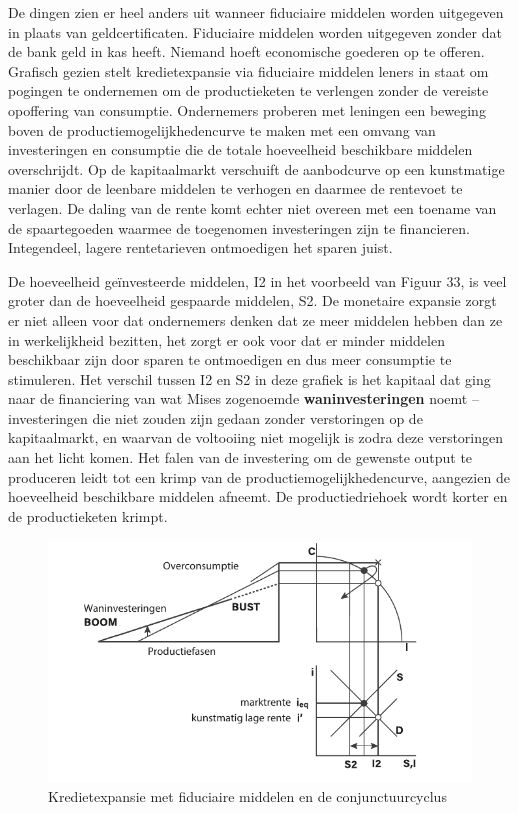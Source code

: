 De dingen zien er heel anders uit wanneer fiduciaire middelen worden uitgegeven in plaats van geldcertificaten. Fiduciaire middelen worden uitgegeven zonder dat de bank geld in kas heeft. Niemand hoeft economische goederen op te offeren. Grafisch gezien stelt kredietexpansie via fiduciaire middelen leners in staat om pogingen te ondernemen om de productieketen te verlengen zonder de vereiste opoffering van consumptie. Ondernemers proberen met leningen een beweging boven de productiemogelijkhedencurve te maken met een omvang van investeringen en consumptie die de totale hoeveelheid beschikbare middelen overschrijdt. Op de kapitaalmarkt verschuift de aanbodcurve op een kunstmatige manier door de leenbare middelen te verhogen en daarmee de rentevoet te verlagen. De daling van de rente komt echter niet overeen met een toename van de spaartegoeden waarmee de toegenomen investeringen zijn te financieren. Integendeel, lagere rentetarieven ontmoedigen het sparen juist.

De hoeveelheid geïnvesteerde middelen, I2 in het voorbeeld van Figuur 33, is veel groter dan de hoeveelheid gespaarde middelen, S2. De monetaire expansie zorgt er niet alleen voor dat ondernemers denken dat ze meer middelen hebben dan ze in werkelijkheid bezitten, het zorgt er ook voor dat er minder middelen beschikbaar zijn door sparen te ontmoedigen en dus meer consumptie te stimuleren. Het verschil tussen I2 en S2 in deze grafiek is het kapitaal dat ging naar de financiering van wat Mises zogenoemde \textbf{waninvesteringen} noemt -- investeringen die niet zouden zijn gedaan zonder verstoringen op de kapitaalmarkt, en waarvan de voltooiing niet mogelijk is zodra deze verstoringen aan het licht komen.\autocite{177} Het falen van de investering om de gewenste output te produceren leidt tot een krimp van de productiemogelijkhedencurve, aangezien de hoeveelheid beschikbare middelen afneemt. De productiedriehoek wordt korter en de productieketen krimpt.

\begin{figure}
\centering
    \includegraphics[width=\textwidth]{figures/fig33.pdf}
    \caption[Kredietexpansie met fiduciaire middelen en de conjunctuurcyclus]{Kredietexpansie met fiduciaire middelen en de conjunctuurcyclus}
    \label{fig33}
\end{figure}

